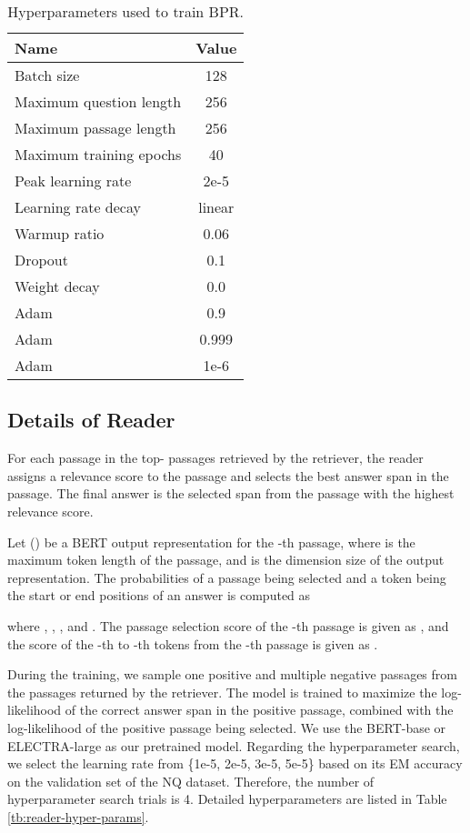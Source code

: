 \documentclass[11pt,a4paper]{article}
\begin{document}
\begin{table}[t]
  \centering
  \small{
    \begin{tabular}{l|c}
      \toprule
      \textbf{Name}                    & \textbf{Value}  \\
      \midrule
      Batch size              & 128    \\
      Maximum question length & 256    \\
      Maximum passage length  & 256    \\
      Maximum training epochs & 40 \\
      Peak learning rate      & 2e-5   \\
      Learning rate decay     & linear \\
      Warmup ratio            & 0.06   \\
      Dropout                 & 0.1    \\
      Weight decay            & 0.0    \\
      Adam           & 0.9    \\
      Adam           & 0.999  \\
      Adam          & 1e-6   \\
      \bottomrule
    \end{tabular}
  }
  \caption{Hyperparameters used to train BPR.}
  \label{tb:biencoder-hyper-params}
\end{table}

\subsection{Details of Reader}
\label{sec:reader}

For each passage in the top- passages retrieved by the retriever, the reader assigns a relevance score to the passage and selects the best answer span in the passage.
The final answer is the selected span from the passage with the highest relevance score.

Let  () be a BERT output representation for the -th passage, where  is the maximum token length of the passage, and  is the dimension size of the output representation.
The probabilities of a passage being selected and  a token being the start or end positions of an answer is computed as


where , , , and .
The passage selection score of the -th passage is given as , and the score of the -th to -th tokens from the -th passage is given as .

During the training, we sample one positive and multiple negative passages from the passages returned by the retriever.
The model is trained to maximize the log-likelihood of the correct answer span in the positive passage,  combined with the log-likelihood of the positive passage being selected.
We use the BERT-base or ELECTRA-large as our pretrained model.
Regarding the hyperparameter search, we select the learning rate from \{1e-5, 2e-5, 3e-5, 5e-5\} based on its EM accuracy on the validation set of the NQ dataset.
Therefore, the number of hyperparameter search trials is 4.
Detailed hyperparameters are listed in Table \ref{tb:reader-hyper-params}.
\end{document}
